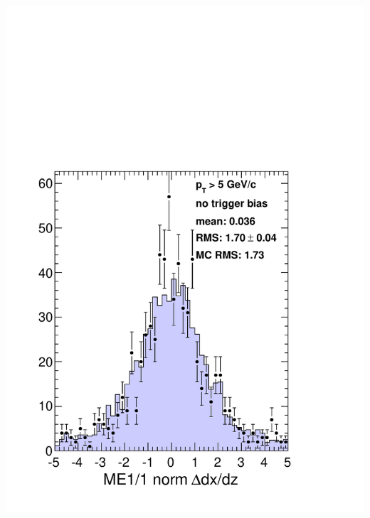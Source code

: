 \documentclass[compress]{beamer}
\begin{document}
\begin{frame}
\begin{columns}
\includegraphics[width=\linewidth]{me11_dXdZnorm.pdf}


\end{columns}
\end{frame}
\end{document}
